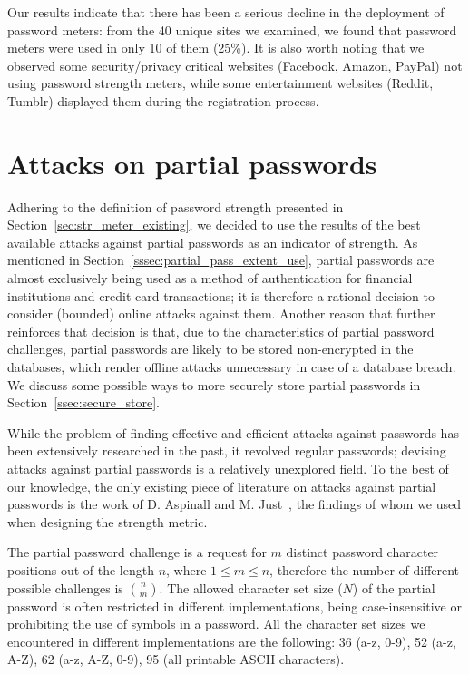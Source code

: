     Our results indicate that there has been a serious decline in the deployment of password meters: from the 40 unique sites we examined, we found that password meters were used in only 10 of them (25\%). It is also worth noting that we observed some security/privacy critical websites (\eg Facebook, Amazon, PayPal) not using password strength meters, while some entertainment websites (Reddit, Tumblr) displayed them during the registration process.


\section{Attacks on partial passwords}
  \label{sec:proj_dict_attack}
  Adhering to the definition of password strength presented in Section~\ref{sec:str_meter_existing}, we decided to use the results of the best available attacks against partial passwords as an indicator of strength. As mentioned in Section~\ref{sssec:partial_pass_extent_use}, partial passwords are almost exclusively being used as a method of authentication for financial institutions and credit card transactions; it is therefore a rational decision to consider (bounded) online attacks against them. Another reason that further reinforces that decision is that, due to the characteristics of partial password challenges, partial passwords are likely to be stored non-encrypted in the databases, which render offline attacks unnecessary in case of a database breach. We discuss some possible ways to more securely store partial passwords in Section~\ref{ssec:secure_store}.

  While the problem of finding effective and efficient attacks against passwords has been extensively researched in the past, it revolved regular passwords; devising attacks against partial passwords is a relatively unexplored field. To the best of our knowledge, the only existing piece of literature on attacks against partial passwords is the work of D. Aspinall and M. Just~\cite{part_pass}, the findings of whom we used when designing the strength metric.

  The partial password challenge is a request for $m$ distinct password character positions out of the length $n$, where $1 \leq m \leq n$, therefore the number of different possible challenges is {\Large $\binom{n}{m}$}. The allowed character set size ($N$) of the partial password is often restricted in different implementations, being case-insensitive or prohibiting the use of symbols in a password. All the character set sizes we encountered in different implementations are the following: 36 (a-z, 0-9), 52 (a-z, A-Z), 62 (a-z, A-Z, 0-9), 95 (all printable ASCII characters).

